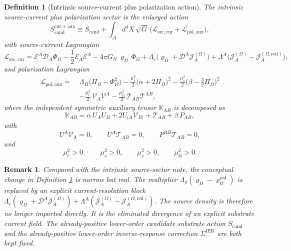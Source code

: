 \documentclass[11pt]{article}
\newcommand{\Sub}{\mathcal{A}}
\newcommand{\ProjSub}{P}
\newcommand{\SpatialD}{\mathcal D}
\newcommand{\FlowPot}{\Phi_\Omega}
\newcommand{\BalanceField}{\Pi_\Omega}
\newcommand{\BalMult}{\Lambda_\Pi}
\newcommand{\SourceDensity}{\varrho_\Omega}
\newcommand{\SourceDensityRed}{\varrho_\Omega^{\mathrm{red}}}
\newcommand{\SourceCurrent}{\mathcal J^{(\Omega)}}
\newcommand{\SourceCurrentRed}{\mathcal J^{(\Omega,\mathrm{red})}}
\newcommand{\ContMult}{\Lambda_{\mathrm c}}
\newcommand{\CurrentMult}{\Lambda}
\newcommand{\SourceFlux}{\mathcal E}
\newcommand{\SigmaIER}{\Sigma^{\mathrm{IER}}}
\newcommand{\AuxPol}{\mathbb K}
\newcommand{\CandAction}{S_{\mathrm{cand}}}
\newcommand{\CurrentAction}{S_{\mathrm{cand}}^{\mathrm{cur+aux}}}
\newtheorem{definition}{Definition}
\newtheorem{remark}{Remark}
\begin{document}
\begin{definition}[Intrinsic source-current plus polarization action]
\label{def:action}
The \emph{intrinsic source-current plus polarization sector} is the enlarged action
\begin{equation}
\CurrentAction
\equiv
\CandAction
+
\int_{\Sub} d^4X\,\sqrt{G}\,
\bigl(
\mathcal L_{\mathrm{src,cur}}
+\mathcal L_{\mathrm{pol,aux}}
\bigr),
\label{eq:fullaction}
\end{equation}
with source-current Lagrangian
\begin{equation}
\mathcal L_{\mathrm{src,cur}}
=
\SourceFlux^A\SpatialD_A\FlowPot
-\frac12 \SourceFlux_A\SourceFlux^A
-4\pi G_N\,\SourceDensity\,\FlowPot
+\ContMult\bigl(\SourceDensity+\SpatialD^A\SourceCurrent_A\bigr)
+\CurrentMult^A\bigl(\SourceCurrent_A-\SourceCurrentRed_A\bigr),
\label{eq:lcur}
\end{equation}
and polarization Lagrangian
\begin{align}
\mathcal L_{\mathrm{pol,aux}}
=\;&
\BalMult\bigl(\BalanceField-\FlowPot^2\bigr)
-\frac{\mu_t^2}{2}\bigl(\alpha+2\BalanceField\bigr)^2
-\frac{\mu_s^2}{2}\bigl(\beta-\tfrac32\BalanceField\bigr)^2
\nonumber\\
&-\frac{\mu_v^2}{2}\,\mathcal V_A\mathcal V^A
-\frac{\mu_{\mathrm{tf}}^2}{2}\,\mathcal T_{AB}\mathcal T^{AB},
\label{eq:laux}
\end{align}
where the independent symmetric auxiliary tensor \(\AuxPol_{AB}\) is decomposed as
\begin{equation}
\AuxPol_{AB}
=
\alpha\,U_AU_B
+2U_{(A}\mathcal V_{B)}
+\mathcal T_{AB}
+\beta\,\ProjSub_{AB},
\label{eq:Kdecomp}
\end{equation}
with
\begin{equation}
U^A\mathcal V_A=0,
\qquad
U^A\mathcal T_{AB}=0,
\qquad
\ProjSub^{AB}\mathcal T_{AB}=0,
\label{eq:TVcond}
\end{equation}
and
\begin{equation}
\mu_t^2>0,
\qquad
\mu_s^2>0,
\qquad
\mu_v^2>0,
\qquad
\mu_{\mathrm{tf}}^2>0.
\label{eq:masses}
\end{equation}
\end{definition}

\begin{remark}
Compared with the intrinsic source-sector note, the conceptual change in Definition \ref{def:action} is narrow but real. The multiplier \(\Lambda_\rho(\SourceDensity-\SourceDensityRed)\) is replaced by an explicit current-resolution block \(\ContMult(\SourceDensity+\SpatialD^A\SourceCurrent_A)+\CurrentMult^A(\SourceCurrent_A-\SourceCurrentRed_A)\). The source density is therefore no longer imported directly. It is the eliminated divergence of an explicit substrate current field. The already-positive lower-order candidate substrate action \(\CandAction\) and the already-positive lower-order inverse-response correction \(\SigmaIER\) are both kept fixed.
\end{remark}
\end{document}

